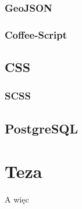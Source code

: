 \subsubsection{GeoJSON}
\subsubsection{Coffee-Script}
\subsection{CSS}
\subsubsection{SCSS}
\subsection{PostgreSQL}

\section{Teza}
A więc 